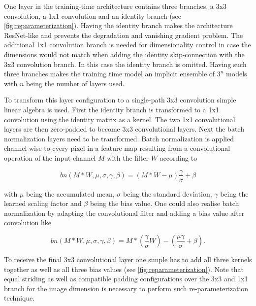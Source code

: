One layer in the training-time architecture contains three branches, a 3x3 convolution, a 1x1 convolution and an identity branch (see \autoref{fig:reparameterization}). Having the identity branch makes the architecture ResNet-like and prevents the degradation and vanishing gradient problem. The additional 1x1 convolution branch is needed for dimensionality control in case the dimensions would not match when adding the identity skip-connection with the 3x3 convolution branch. In this case the identity branch is omitted. Having such three branches makes the training time model an implicit ensemble of $3^n$ models with $n$ being the number of layers used. 

To transform this layer configuration to a single-path 3x3 convolution simple linear algebra is used. First the identity branch is transformed to a 1x1 convolution using the identity matrix as a kernel. The two 1x1 convolutional layers are then zero-padded to become 3x3 convolutional layers. Next the batch normalization layers need to be transformed. Batch normalization is applied channel-wise to every pixel in a feature map resulting from a convolutional operation of the input channel $M$ with the filter $W$ according to 

\begin{equation} \label{eq:batchnormalization}
	bn(M*W, \mu, \sigma, \gamma, \beta) = (M*W - \mu)\frac{\gamma}{\sigma} + \beta
\end{equation}

with $\mu$ being the accumulated mean, $\sigma$ being the standard deviation, $\gamma$ being the learned scaling factor and $\beta$ being the bias value. One could also realise batch normalization by adapting the convolutional filter and adding a bias value after convolution like 

\begin{equation} \label{eq:batchnormalizationtransformed}
	bn(M*W, \mu, \sigma, \gamma, \beta) = M*(\frac{\gamma}{\sigma}W) - (\frac{\mu\gamma}{\sigma} + \beta).
\end{equation}

To receive the final 3x3 convolutional layer one simple has to add all three kernels together as well as all three bias values (see \autoref{fig:reparameterization}). Note that equal striding as well as compatible padding configurations over the 3x3 and 1x1 branch for the image dimension is necessary to perform such re-parameterization technique. 
